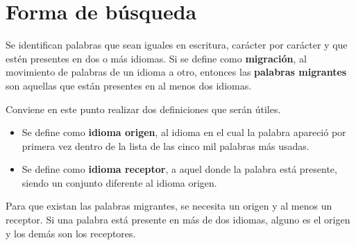 \section{Forma de búsqueda} %

Se identifican palabras que sean iguales en escritura, carácter por carácter y
que estén presentes en dos o más idiomas.  Si se define como
\textbf{migración}, al movimiento de palabras de un idioma a otro, entonces las
\textbf{palabras migrantes}  son aquellas que están presentes en al
menos dos idiomas.  

Conviene en este punto realizar dos definiciones que serán
útiles.
{}
\begin{itemize}
\item 
Se define como  \textbf{idioma origen}, al idioma en el cual la palabra
apareció por primera vez dentro de la lista de las cinco mil palabras más
usadas.  

\item 
Se define como \textbf{idioma receptor}, a  aquel donde la palabra está
presente, siendo un conjunto diferente al idioma origen.  
\end{itemize}


Para que existan las palabras migrantes, se necesita un origen y al menos un
receptor. Si una palabra está presente en más de dos idiomas, alguno es el
origen y los demás son los receptores. 


